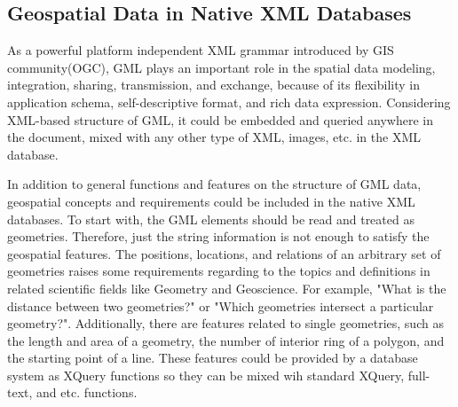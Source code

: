 \documentclass[a4paper,12pt]{article}
\begin{document}
\subsection{Geospatial Data in Native XML Databases}
\label{s.geo-data-in-xml-data}
As a powerful platform independent XML grammar introduced by GIS community(OGC), GML plays an important role in the spatial data modeling, integration, sharing, transmission, and exchange, because of its flexibility in application schema, self-descriptive format, and rich data expression. Considering XML-based structure of GML, it could be embedded and queried anywhere in the document, mixed with any other type of XML, images, etc. in the XML database. 

In addition to general functions and features on the structure of GML data, geospatial concepts and requirements could be included in the native XML databases. To start with, the GML elements should be read and treated as geometries. Therefore, just the string information is not enough to satisfy the geospatial features. The positions, locations, and relations of an arbitrary set of geometries raises some requirements regarding to the topics and definitions in related scientific fields like Geometry and Geoscience. For example, "What is the distance between two geometries?" or "Which geometries intersect a particular geometry?". Additionally, there are features related to single geometries, such as the length and area of a geometry, the number of interior ring of a polygon, and the starting point of a line. These features could be provided by a database system as XQuery functions so they can be mixed wih standard XQuery, full-text, and etc. functions.


\end{document}
